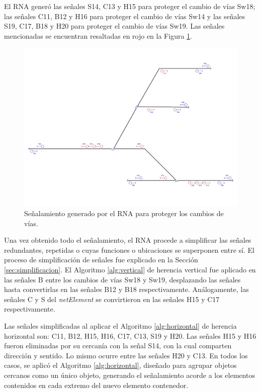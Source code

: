 	El RNA generó las señales S14, C13 y H15 para proteger el cambio de vías Sw18; las señales C11, B12 y H16 para proteger el cambio de vías Sw14 y las señales S19, C17, B18 y H20 para proteger el cambio de vías Sw19. Las señales mencionadas se encuentran resaltadas en rojo en la Figura \ref{fig:EJ7_6}.
	
	\begin{figure}[H]
		\centering
		\includegraphics[width=1\textwidth]{resultados-obtenidos/ejemplo7/images/7_step4.png}
		\centering\caption{Señalamiento generado por el RNA para proteger los cambios de vías.}
		\label{fig:EJ7_6}
	\end{figure}
	
	Una vez obtenido todo el señalamiento, el RNA procede a simplificar las señales redundantes, repetidas o cuyas funciones o ubicaciones se superponen entre sí. El proceso de simplificación de señales fue explicado en la Sección \ref{sec:simplificacion}. El Algoritmo \ref{alg:vertical} de herencia vertical fue aplicado en las señales B entre los cambios de vías Sw18 y Sw19, desplazando las señales hasta convertirlas en las señales B12 y B18 respectivamente. Análogamente, las señales C y S del \textit{netElement} se convirtieron en las señales H15 y C17 respectivamente.
	
	Las señales simplificadas al aplicar el Algoritmo \ref{alg:horizontal} de herencia horizontal son: C11, B12, H15, H16, C17, C13, S19 y H20. Las señales H15 y H16 fueron eliminadas por su cercanía con la señal S14, con la cual comparten dirección y sentido. Lo mismo ocurre entre las señales H20 y C13. En todos los casos, se aplicó el Algoritmo \ref{alg:horizontal}, diseñado para agrupar objetos cercanos como un único objeto, generando el señalamiento acorde a los elementos contenidos en cada extremo del nuevo elemento contenedor.
	
